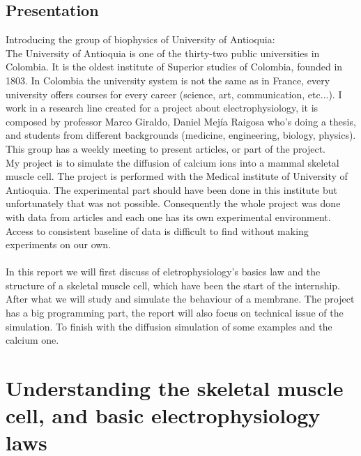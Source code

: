\documentclass[a4paper,11pt]{report}
\begin{document}
\section*{Presentation}
Introducing the group of biophysics of University of Antioquia: \\
The University of Antioquia is one of the thirty-two public universities in Colombia. It is the oldest institute of Superior studies of Colombia, founded in 1803. In Colombia the university system is not the same as in France, every university offers courses for every career (science, art, communication, etc...).
I work in a research line created for a project about electrophysiology, it is composed by professor Marco Giraldo, Daniel Mejía Raigosa who's doing a thesis, and students from different backgrounds (medicine, engineering, biology, physics). This group has a weekly meeting to present articles, or part of the project. \\
My project is to simulate the diffusion of calcium ions into a mammal skeletal muscle cell. The project is performed with the Medical institute of University of Antioquia. The experimental part should have been done in this institute but unfortunately that was not possible. Consequently the whole project was done with data from articles and each one has its own experimental environment. Access to consistent baseline of data is difficult to find without making experiments on our own. \\ 
\\
In this report we will first discuss of eletrophysiology's basics law and the structure of a skeletal muscle cell, which have been the start of the internship. After what we will study and simulate the behaviour of a membrane. The project has a big programming part, the report will also focus on technical issue of the simulation. To finish with the diffusion simulation of some examples and the calcium one.

\tableofcontents




\chapter{Understanding the skeletal muscle cell, and basic electrophysiology laws}
\end{document}
